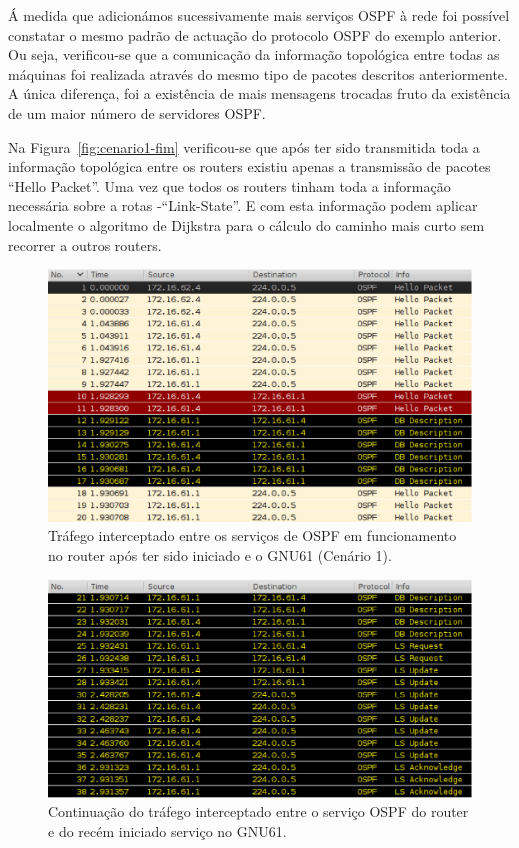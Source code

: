 \documentclass[a4paper,12pt]{article}
\begin{document}
	Á medida que adicionámos sucessivamente mais serviços OSPF à rede foi possível constatar o mesmo padrão de actuação do protocolo OSPF do exemplo anterior. Ou seja, verificou-se que a comunicação da informação topológica entre todas as máquinas foi realizada através do mesmo tipo de pacotes descritos anteriormente. A única diferença, foi a existência de mais mensagens trocadas fruto da existência de um maior número de servidores OSPF.

	Na Figura~\ref{fig:cenario1-fim} verificou-se que após ter sido transmitida toda a informação topológica entre os routers existiu apenas a transmissão de pacotes ``Hello Packet''. Uma vez que todos os routers tinham toda a informação necessária sobre a rotas -``Link-State''. E com esta informação podem aplicar localmente o algoritmo de Dijkstra para o cálculo do caminho mais curto sem recorrer a outros routers.

\begin{figure}[htp]
	\begin{center}
		\includegraphics[width=6in]{cenario1-inicio1}
	\end{center}
	\caption{Tráfego interceptado entre os serviços de OSPF em funcionamento no router após ter sido iniciado e o GNU61 (Cenário 1).}
	\label{fig:cenario1-inicio1}
\end{figure}

\begin{figure}[htp]
	\begin{center}
		\includegraphics[width=6in]{cenario1-inicio2}
	\end{center}
	\caption{Continuação do tráfego interceptado entre o serviço OSPF do router e do recém iniciado serviço no GNU61.}
	\label{fig:cenario1-inicio2}
\end{figure}
\end{document}
